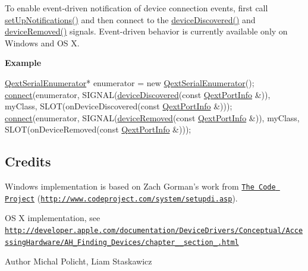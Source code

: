 To enable event-\/driven notification of device connection events, first call \hyperlink{class_qext_serial_enumerator_a5a8caf21f4ad519323f13219651274ec}{set\-Up\-Notifications()} and then connect to the \hyperlink{class_qext_serial_enumerator_a8cd71a66dcd0079328dae193a3e58100}{device\-Discovered()} and \hyperlink{class_qext_serial_enumerator_a44e8a909d4bbbb759a79630e01a4f249}{device\-Removed()} signals. Event-\/driven behavior is currently available only on Windows and O\-S X.

{\bfseries Example} 
\begin{DoxyCode}
\hyperlink{class_qext_serial_enumerator}{QextSerialEnumerator}* enumerator = \textcolor{keyword}{new} \hyperlink{class_qext_serial_enumerator_a5444ed89cea823da4fb9b1dda4cccf52}{QextSerialEnumerator}();
\hyperlink{namespace_qxt_meta_object_a0672fb5917d321762dfd192f229469d5}{connect}(enumerator, SIGNAL(\hyperlink{class_qext_serial_enumerator_a8cd71a66dcd0079328dae193a3e58100}{deviceDiscovered}(\textcolor{keyword}{const} 
      \hyperlink{struct_qext_port_info}{QextPortInfo} &)),
           myClass, SLOT(onDeviceDiscovered(\textcolor{keyword}{const} \hyperlink{struct_qext_port_info}{QextPortInfo} &)));
\hyperlink{namespace_qxt_meta_object_a0672fb5917d321762dfd192f229469d5}{connect}(enumerator, SIGNAL(\hyperlink{class_qext_serial_enumerator_a44e8a909d4bbbb759a79630e01a4f249}{deviceRemoved}(\textcolor{keyword}{const} \hyperlink{struct_qext_port_info}{QextPortInfo} &)),
           myClass, SLOT(onDeviceRemoved(\textcolor{keyword}{const} \hyperlink{struct_qext_port_info}{QextPortInfo} &)));
\end{DoxyCode}
\hypertarget{class_qext_serial_enumerator_Credits}{}\subsection{Credits}\label{class_qext_serial_enumerator_Credits}
Windows implementation is based on Zach Gorman's work from \href{http://www.codeproject.com}{\tt The Code Project} (\href{http://www.codeproject.com/system/setupdi.asp}{\tt http\-://www.\-codeproject.\-com/system/setupdi.\-asp}).

O\-S X implementation, see \href{http://developer.apple.com/documentation/DeviceDrivers/Conceptual/AccessingHardware/AH_Finding_Devices/chapter_4_section_2.html}{\tt http\-://developer.\-apple.\-com/documentation/\-Device\-Drivers/\-Conceptual/\-Accessing\-Hardware/\-A\-H\-\_\-\-Finding\-\_\-\-Devices/chapter\-\_\-\_\-section\-\_.\-html}

\begin{DoxyAuthor}{Author}
Michal Policht, Liam Staskawicz 
\end{DoxyAuthor}


